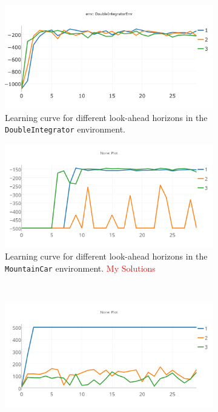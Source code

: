 \documentclass{article}
\begin{document}
\begin{figure}[h!]
    \centering
    \begin{subfigure}{0.45\textwidth}
        \centering
        \includegraphics[width=\textwidth]{figures/part_2_d_a.png}
        \caption{Learning curve for different look-ahead horizons in the \texttt{DoubleIntegrator} environment.}
    \end{subfigure}
    \hspace{0.2 in}
    \begin{subfigure}{0.45\textwidth}
        \centering
        \includegraphics[width=\textwidth]{figures/part_2_d_b.png}
        \caption{Learning curve for different look-ahead horizons in the \texttt{MountainCar} environment.  \textcolor{red}{My Solutions}}
    \end{subfigure}
\\
    \centering
    \begin{subfigure}{0.45\textwidth}
        \centering
        \includegraphics[width=\textwidth]{figures/part_2_d_c.png}

\end{subfigure}
\end{figure}
\end{document}
